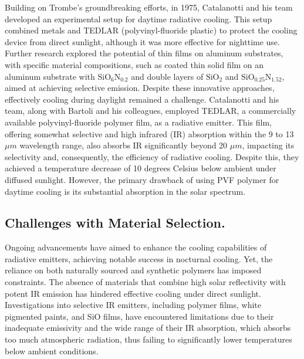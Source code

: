Building on Trombe's groundbreaking efforts, in 1975, Catalanotti and his team developed an experimental setup for daytime radiative cooling. This setup combined metals and TEDLAR (polyvinyl-fluoride plastic) to protect the cooling device from direct sunlight, although it was more effective for nighttime use. Further research explored the potential of thin films on aluminum substrates, with specific material compositions, such as coated thin solid film on an aluminum substrate with $\text{SiO}_6\text{N}_{0.2}$ and double layers of $\text{SiO}_2$ and $\text{SiO}_{0.25}\text{N}_{1.52}$, aimed at achieving selective emission. Despite these innovative approaches, effectively cooling during daylight remained a challenge. Catalanotti and his team, along with Bartoli and his colleagues, employed TEDLAR, a commercially available polyvinyl-fluoride polymer film, as a radiative emitter. This film, offering somewhat selective and high infrared (IR) absorption within the 9 to 13 $\mu m$ wavelength range, also absorbs IR significantly beyond 20 $\mu m$, impacting its selectivity and, consequently, the efficiency of radiative cooling. Despite this, they achieved a temperature decrease of 10 degrees Celsius below ambient under diffused sunlight. However, the primary drawback of using PVF polymer for daytime cooling is its substantial absorption in the solar spectrum.

\subsection{Challenges with Material Selection.}
Ongoing advancements have aimed to enhance the cooling capabilities of radiative emitters, achieving notable success in nocturnal cooling. Yet, the reliance on both naturally sourced and synthetic polymers has imposed constraints. The absence of materials that combine high solar reflectivity with potent IR emission has hindered effective cooling under direct sunlight. Investigations into selective IR emitters, including polymer films, white pigmented paints, and SiO films, have encountered limitations due to their inadequate emissivity and the wide range of their IR absorption, which absorbs too much atmospheric radiation, thus failing to significantly lower temperatures below ambient conditions. %

